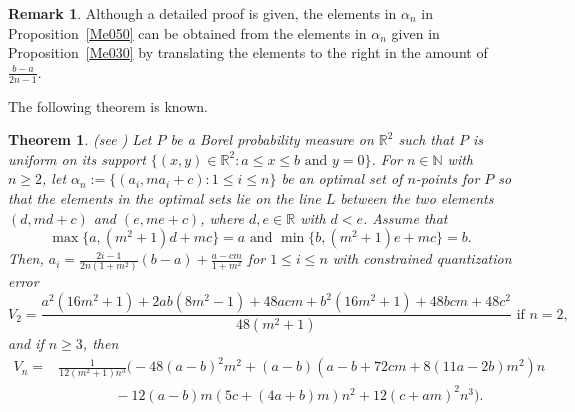 \documentclass[12pt, reqno]{amsart}
\theoremstyle{plain}
\newtheorem{theorem}[subsection]{Theorem}
\theoremstyle{definition}
\newtheorem{remark}[subsection]{Remark}
\newcommand{\set}[1]{\{#1\}}%
\newcommand{\ga}{\alpha}
\newcommand{\D}[1]{\mathbb{#1}}%
\newcommand{\te}{\text}%
\begin{document}
  \begin{remark}
 Although a detailed proof is given, the elements in $\ga_n$ in Proposition~\ref{Me050} can be obtained from the elements in $\ga_n$ given in Proposition~\ref{Me030} by translating the elements to the right in the amount of $\frac{b-a}{2 n-1}$.
  \end{remark} 
  
 The following theorem is known. 
\begin{theorem}(see \cite[Proposition~3.1]{PR1}) \label{sec2Theorem1}
Let $P$ be a Borel probability measure on $\D R^2$ such that $P$ is uniform on its support $\set{(x, y) \in \D R^2 : a\leq x\leq b \te{ and } y=0}$. For $n\in \D N$ with $n\geq 2$, let $\ga_n:=\{(a_i,m a_i+c): 1\leq i \leq n\}$ be an optimal set of $n$-points for $P$ so that the elements in the optimal sets lie on the line $L$ between the two elements $(d, md+c)$ and $(e, me+c)$, where $d, e\in \D R$ with $d<e$. Assume that
\[\max\set{a, (m^2+1)d+mc}=a \te{ and } \min\set{b, (m^2+1) e+mc}=b.\]
 Then, $a_i=\frac {2i-1}{2n(1+m^2)}(b-a)+\frac{a-cm}{1+m^2}$ for $1\leq i\leq n$ with constrained quantization error
\[V_2=\frac{a^2 \left(16 m^2+1\right)+2 a b \left(8 m^2-1\right)+48 a c m+b^2 \left(16 m^2+1\right)+48 b c m+48 c^2}{48 \left(m^2+1\right)} \te{ if } n=2,\]
and if $n\geq 3$, then
 \begin{align*}
V_n=&\frac 1{12 \left(m^2+1\right) n^3}\Big(-48 (a - b)^2 m^2 + (a - b) (a - b + 72 c m + 8 (11 a - 2 b) m^2) n \\
&\qquad \qquad -
 12 (a - b) m (5 c + (4 a + b) m) n^2 + 12 (c + a m)^2 n^3\Big).
\end{align*} 
 \end{theorem} 
 
\end{document}

